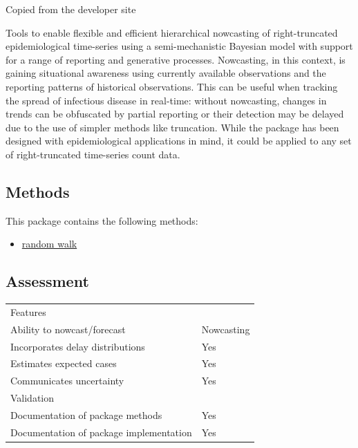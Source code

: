 \documentclass[
  letterpaper,
  DIV=11,
  numbers=noendperiod]{scrreprt}
\providecommand{\tightlist}{%
  \setlength{\itemsep}{0pt}\setlength{\parskip}{0pt}}\usepackage{longtable,booktabs,array}
\begin{document}
Copied from the developer site

Tools to enable flexible and efficient hierarchical nowcasting of
right-truncated epidemiological time-series using a semi-mechanistic
Bayesian model with support for a range of reporting and generative
processes. Nowcasting, in this context, is gaining situational awareness
using currently available observations and the reporting patterns of
historical observations. This can be useful when tracking the spread of
infectious disease in real-time: without nowcasting, changes in trends
can be obfuscated by partial reporting or their detection may be delayed
due to the use of simpler methods like truncation. While the package has
been designed with epidemiological applications in mind, it could be
applied to any set of right-truncated time-series count data.

\subsection*{Methods}\label{methods-9}

This package contains the following methods:

\begin{itemize}
\tightlist
\item
  \hyperref[sec-randomwalk]{random walk}
\end{itemize}

\subsection*{Assessment}\label{assessment-9}

\begin{longtable}[]{@{}
  >{\raggedright\arraybackslash}p{}
  >{\raggedright\arraybackslash}p{}@{}}
\toprule\noalign{}
\endhead
\bottomrule\noalign{}
\endlastfoot
Features & \\
Ability to nowcast/forecast & Nowcasting \\
Incorporates delay distributions & Yes \\
Estimates expected cases & Yes \\
Communicates uncertainty & Yes \\
Validation & \\
Documentation of package methods & Yes \\
Documentation of package implementation & Yes \\
\end{longtable}
\end{document}
